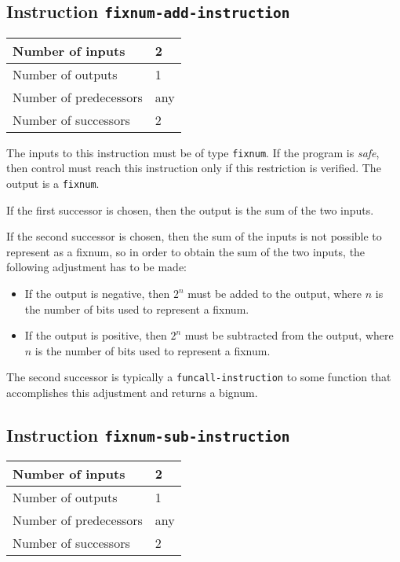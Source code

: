 \subsection{Instruction \texttt{fixnum-add-instruction}}
\label{hir-instruction-fixnum-add}

\begin{tabular}{|l|l|}
\hline
Number of inputs & 2\\
\hline
Number of outputs & 1\\
\hline
Number of predecessors & any\\
\hline
Number of successors & 2\\
\hline
\end{tabular}

The inputs to this instruction must be of type \texttt{fixnum}.  If
the program is \emph{safe}, then control must reach this instruction
only if this restriction is verified.  The output is a
\texttt{fixnum}.

If the first successor is chosen, then the output is the sum of the
two inputs.

If the second successor is chosen, then the sum of the inputs is not
possible to represent as a fixnum, so in order to obtain the sum of
the two inputs, the following adjustment has to be made:

\begin{itemize}
\item If the output is negative, then $2^n$ must be added to the
  output, where $n$ is the number of bits used to represent a fixnum. 
\item If the output is positive, then $2^n$ must be subtracted from
  the output, where $n$ is the number of bits used to represent a
  fixnum.
\end{itemize}

The second successor is typically a \texttt{funcall-instruction} to
some function that accomplishes this adjustment and returns a bignum.

\subsection{Instruction \texttt{fixnum-sub-instruction}}
\label{hir-instruction-fixnum-sub}

\begin{tabular}{|l|l|}
\hline
Number of inputs & 2\\
\hline
Number of outputs & 1\\
\hline
Number of predecessors & any\\
\hline
Number of successors & 2\\
\hline
\end{tabular}

